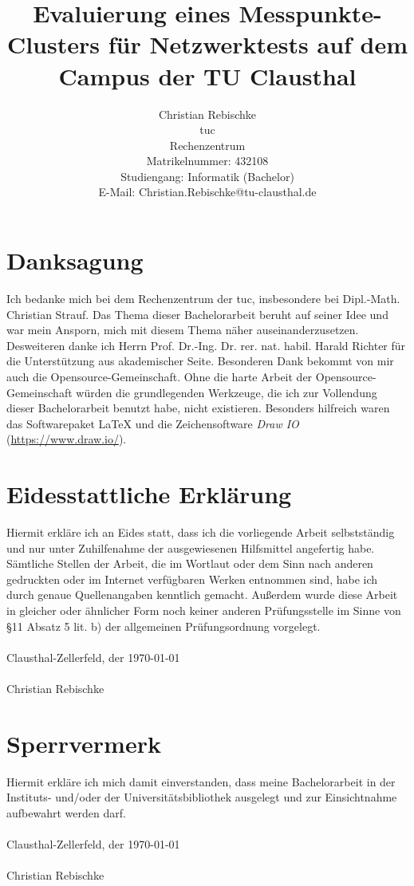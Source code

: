 \documentclass[titlepage]{report}
\title{Evaluierung eines Messpunkte-Clusters für Netzwerktests auf dem
Campus der TU Clausthal}
\author{Christian Rebischke\\
\gls{tuc}\\
Rechenzentrum\\
Matrikelnummer: 432108 \\
Studiengang: Informatik (Bachelor) \\
E-Mail: Christian.Rebischke@tu-clausthal.de}
\begin{document}
\maketitle
\chapter*{Danksagung}
Ich bedanke mich bei dem Rechenzentrum der \gls{tuc}, insbesondere bei
Dipl.\hyp{}Math. Christian Strauf. Das Thema dieser Bachelorarbeit
beruht auf seiner Idee und war mein Ansporn, mich mit diesem Thema näher
auseinanderzusetzen. Desweiteren danke ich Herrn Prof. Dr.\hyp{}Ing. Dr.
rer. nat. habil. Harald Richter für die Unterstützung aus akademischer
Seite. Besonderen Dank bekommt von mir auch die
Opensource\hyp{}Gemeinschaft.  Ohne die harte Arbeit der
Opensource\hyp{}Gemeinschaft würden die grundlegenden Werkzeuge, die
ich zur Vollendung dieser Bachelorarbeit benutzt habe, nicht
existieren. Besonders hilfreich waren das Softwarepaket \LaTeX{} und die
Zeichensoftware \emph{Draw IO} (\url{https://www.draw.io/}).
\chapter*{Eidesstattliche Erklärung}
Hiermit erkläre ich an Eides statt, dass ich die vorliegende Arbeit
selbstständig und nur unter Zuhilfenahme der ausgewiesenen Hilfsmittel
angefertig habe. Sämtliche Stellen der Arbeit, die im Wortlaut oder dem
Sinn nach anderen gedruckten oder im Internet verfügbaren Werken
entnommen sind, habe ich durch genaue Quellenangaben kenntlich gemacht.
Außerdem wurde diese Arbeit in gleicher oder ähnlicher Form noch keiner
anderen Prüfungsstelle im Sinne von \S 11 Absatz 5 lit. b) der
allgemeinen Prüfungsordnung vorgelegt.
\\
\\
Clausthal-Zellerfeld, der \today
\\
\\
Christian Rebischke
\chapter*{Sperrvermerk}
Hiermit erkläre ich mich damit einverstanden, dass meine Bachelorarbeit
in der Instituts- und/oder der Universitätsbibliothek ausgelegt
und zur Einsichtnahme aufbewahrt werden darf.
\\
\\
Clausthal-Zellerfeld, der \today
\\
\\
Christian Rebischke
\tableofcontents
\end{document}
